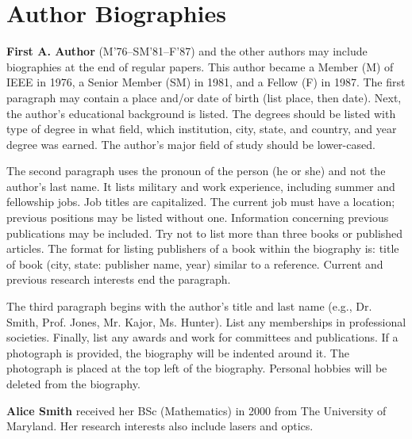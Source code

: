 \documentclass[9pt,twocolumn,twoside]{osajnl}
\begin{document}

 \section*{Author Biographies}

\setlength\intextsep{0pt}

\noindent \textbf{First A. Author} (M’76–SM’81–F’87) and the other authors may include biographies at the end of regular papers. This author became a Member (M) of IEEE in 1976, a Senior Member (SM) in 1981, and a Fellow (F) in 1987. The first paragraph may contain a place and/or date of birth (list place, then date). Next, the author’s educational background is listed. The degrees should be listed with type of degree in what field, which institution, city, state, and country, and year degree was earned. The author’s major field of study should be lower-cased.
  
The second paragraph uses the pronoun of the person (he or she) and not the author’s last name. It lists military and work experience, including summer and fellowship jobs. Job titles are capitalized. The current job must have a location; previous positions may be listed without one. Information concerning previous publications may be included. Try not to list more than three books or published articles. The format for listing publishers of a book within the biography is: title of book (city, state: publisher name, year) similar to a reference. Current and previous research interests end the paragraph.

The third paragraph begins with the author’s title and last name (e.g., Dr. Smith, Prof. Jones, Mr. Kajor, Ms. Hunter). List any memberships in professional societies. Finally, list any awards and work for committees and publications.  If a photograph is provided, the biography will be indented around it. The photograph is placed at the top left of the biography. Personal hobbies will be deleted from the biography.

\medskip

   \noindent
   \textbf{Alice Smith} received her BSc (Mathematics) in 2000 from The University of Maryland. Her research interests also include lasers and optics.
  
\end{document}
